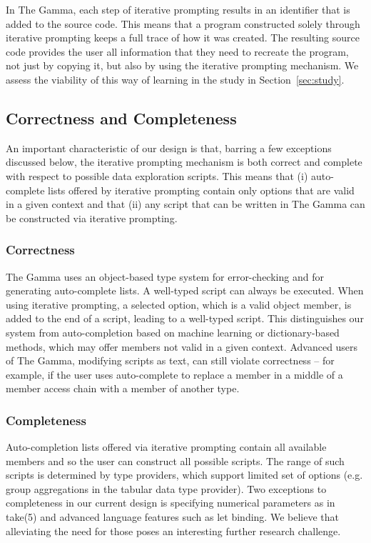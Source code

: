 \documentclass[manuscript,review,anonymous]{acmart}
\newcommand{\ikvd}[1]{{\fontfamily{zi4}\selectfont\small #1}}
\begin{document}
In The Gamma, each step of iterative prompting results in an identifier that is
added to the source code. This means that a program constructed solely through iterative prompting
keeps a full trace of how it was created. The resulting source code provides the user all
information that they need to recreate the program, not just by copying it, but also by using the
iterative prompting mechanism. We assess the viability of this way of learning in the study in
Section~\ref{sec:study}.

\subsection{Correctness and Completeness}
\label{sec:design-cc}

An important characteristic of our design is that, barring a few exceptions discussed below, the iterative
prompting mechanism is both correct and complete with respect to possible data exploration scripts.
This means that (i) auto-complete lists offered by iterative prompting contain
only options that are valid in a given context and that (ii) any script that can be written
in The Gamma can be constructed via iterative prompting.

\subsubsection*{Correctness} The Gamma uses an object-based type system for error-checking and for
generating auto-complete lists. A well-typed script can always be executed. When using iterative
prompting, a selected option, which is a valid object member, is added to the end of a script,
leading to a well-typed script. This distinguishes our system from auto-completion based on machine
learning or dictionary-based methods, which may offer members not valid in a given context. Advanced
users of The Gamma, modifying scripts as text, can still violate correctness -- for example, if the
user uses auto-complete to replace a member in a middle of a member access chain with a member of another type.

\subsubsection*{Completeness} Auto-completion lists offered via iterative prompting contain
all available members and so the user can construct all possible scripts. The range of such scripts
is determined by type providers, which support limited set of options (e.g. group aggregations in
the tabular data type provider). Two exceptions to completeness in our current design is specifying
numerical parameters as in \ikvd{take(5)} and advanced language features such as let binding.
We believe that alleviating the need for those poses an interesting further research challenge.
\end{document}
